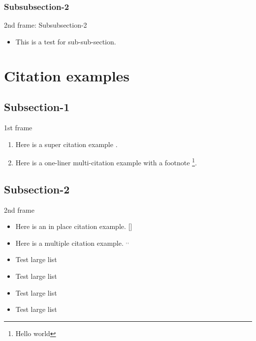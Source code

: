 \subsubsection{Subsubsection-2}
\begin{frame}{2nd frame: Subsubsection-2}
\begin{itemize}
    \item This is a test for sub-sub-section.
\end{itemize}
\end{frame}

\section{Citation examples}
\subsection{Subsection-1}
\begin{frame}{1st frame}
\begin{enumerate}

    \item Here is a super citation example \cite{Rubel2014, Nicklas2010}.
    \item Here is a one-liner multi-citation example  with a footnote \renewcommand{\thefootnote}{\roman{footnote}}\footnote{Hello world}.
\end{enumerate}
\addfootspace{}
\addfootspace{}
\addfootspace{}
\end{frame}

\subsection{Subsection-2}
\begin{frame}{2nd frame}
    \begin{itemize}
        \item Here is an in place citation example. [{\scriptsize {}}]
        \item Here is a multiple citation example. $^,$$^,$
        \item Test large list
        \item Test large list
        \item Test large list
        \item Test large list        
    \end{itemize}
    \addfootspace{}
    \addfootspace{}
    \addfootspace{}
\end{frame}

